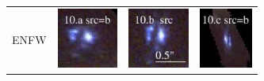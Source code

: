 \documentclass[useAMS,usenatbib]{mn2e}
\begin{document}
\begin{table}
\begin{tabular}{cccc}
    \multicolumn{1}{m{1cm}}{{\Large ENFW}}
    & \multicolumn{1}{m{1.7cm}}{\includegraphics[height=2.00cm,clip]{figs/enfw_img/rgb.pre_10_a_b_tri.ps}}
    & \multicolumn{1}{m{1.7cm}}{\includegraphics[height=2.00cm,clip]{figs/enfw_img/rgb.src_10_b.ps}}
    & \multicolumn{1}{m{1.7cm}}{\includegraphics[height=2.00cm,clip]{figs/enfw_img/rgb.pre_10_c_b_tri.ps}} \\
  \end{tabular}

\end{table}
\end{document}
